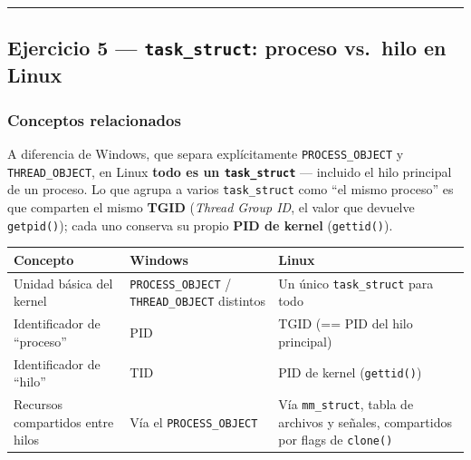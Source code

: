 \documentclass[
  spanish,
]{article}
\newcounter{none} %
\begin{document}
\begin{center}\rule{0.5\linewidth}{0.5pt}\end{center}

\subsection{\texorpdfstring{Ejercicio 5 --- \texttt{task\_struct}:
proceso vs.~hilo en
Linux}{Ejercicio 5 --- task\_struct: proceso vs.~hilo en Linux}}\label{ejercicio-5-task_struct-proceso-vs.-hilo-en-linux}

\subsubsection{Conceptos relacionados}\label{conceptos-relacionados-4}

A diferencia de Windows, que separa explícitamente
\texttt{PROCESS\_OBJECT} y \texttt{THREAD\_OBJECT}, en Linux
\textbf{todo es un \texttt{task\_struct}} --- incluido el hilo principal
de un proceso. Lo que agrupa a varios \texttt{task\_struct} como ``el
mismo proceso'' es que comparten el mismo \textbf{TGID} (\emph{Thread
Group ID}, el valor que devuelve \texttt{getpid()}); cada uno conserva
su propio \textbf{PID de kernel} (\texttt{gettid()}).

{\def\LTcaptype{none} %
\begin{longtable}[]{@{}
  >{\raggedright\arraybackslash}p{}
  >{\raggedright\arraybackslash}p{}
  >{\raggedright\arraybackslash}p{}@{}}
\toprule\noalign{}
\begin{minipage}[b]{\linewidth}\raggedright
Concepto
\end{minipage} & \begin{minipage}[b]{\linewidth}\raggedright
Windows
\end{minipage} & \begin{minipage}[b]{\linewidth}\raggedright
Linux
\end{minipage} \\
\midrule\noalign{}
\endhead
\bottomrule\noalign{}
\endlastfoot
Unidad básica del kernel & \texttt{PROCESS\_OBJECT} /
\texttt{THREAD\_OBJECT} distintos & Un único \texttt{task\_struct} para
todo \\
Identificador de ``proceso'' & PID & TGID (== PID del hilo principal) \\
Identificador de ``hilo'' & TID & PID de kernel (\texttt{gettid()}) \\
Recursos compartidos entre hilos & Vía el \texttt{PROCESS\_OBJECT} & Vía
\texttt{mm\_struct}, tabla de archivos y señales, compartidos por flags
de \texttt{clone()} \\
\end{longtable}
}
\end{document}
